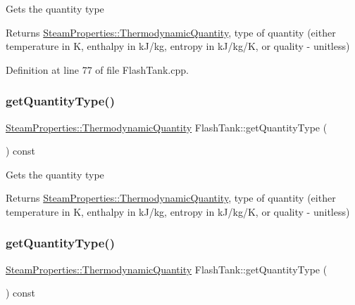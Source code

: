 Gets the quantity type \begin{DoxyReturn}{Returns}
\hyperlink{class_steam_properties_ae0294bedf7d178c2d8fb6aed0f62fbff}{Steam\+Properties\+::\+Thermodynamic\+Quantity}, type of quantity (either temperature in K, enthalpy in k\+J/kg, entropy in k\+J/kg/K, or quality -\/ unitless) 
\end{DoxyReturn}


Definition at line 77 of file Flash\+Tank.\+cpp.

\mbox{\label{class_flash_tank_a1800317a9b9dd8ff8fb18c693e846a45}} 
\subsubsection{\texorpdfstring{get\+Quantity\+Type()}{getQuantityType()}\hspace{0.1cm}{\footnotesize\ttfamily [2/3]}}
{\footnotesize\ttfamily \hyperlink{class_steam_properties_ae0294bedf7d178c2d8fb6aed0f62fbff}{Steam\+Properties\+::\+Thermodynamic\+Quantity} Flash\+Tank\+::get\+Quantity\+Type (\begin{DoxyParamCaption}{ }\end{DoxyParamCaption}) const}

Gets the quantity type \begin{DoxyReturn}{Returns}
\hyperlink{class_steam_properties_ae0294bedf7d178c2d8fb6aed0f62fbff}{Steam\+Properties\+::\+Thermodynamic\+Quantity}, type of quantity (either temperature in K, enthalpy in k\+J/kg, entropy in k\+J/kg/K, or quality -\/ unitless) 
\end{DoxyReturn}
\mbox{\label{class_flash_tank_a1800317a9b9dd8ff8fb18c693e846a45}} 
\subsubsection{\texorpdfstring{get\+Quantity\+Type()}{getQuantityType()}\hspace{0.1cm}{\footnotesize\ttfamily [3/3]}}
{\footnotesize\ttfamily \hyperlink{class_steam_properties_ae0294bedf7d178c2d8fb6aed0f62fbff}{Steam\+Properties\+::\+Thermodynamic\+Quantity} Flash\+Tank\+::get\+Quantity\+Type (\begin{DoxyParamCaption}{ }\end{DoxyParamCaption}) const}


